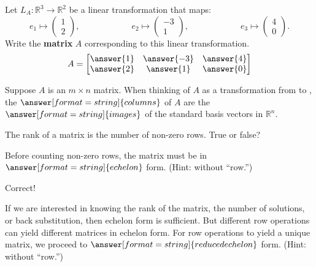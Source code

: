 \documentclass{ximera}
\begin{document}
\begin{question}
  Let $L_A:{\mathbb R}^3\to {\mathbb R}^2$ be a linear transformation that maps:
  \[
  e_1\mapsto \begin{pmatrix} 1\\ 2 \end{pmatrix},\hspace{1in} 
  e_2\mapsto \begin{pmatrix} -3\\ 1 \end{pmatrix},\hspace{1in} 
  e_3\mapsto \begin{pmatrix} 4\\ 0 \end{pmatrix}.
        \]
        Write the \textbf{matrix} $A$ corresponding to this linear
        transformation.
  \[
  A=\begin{bmatrix} \answer{1} &  \answer{-3} &  \answer{4} \\ 
       \answer{2} &  \answer{1} &  \answer{0}\end{bmatrix}
  \]
        
\end{question}


\begin{question}
Suppose $A$ is an $m\times n$ matrix.  When thinking of $A$ as a transformation from
 to 
, the 
$\answer[format=string]{columns}$ of $A$ are the $\answer[format=string]{images}$ of the 
standard basis vectors in ${\mathbb R}^n$. 
\end{question}

\begin{question}
The rank of a matrix is the number of non-zero rows. True or false?  
\begin{multipleChoice}
\end{multipleChoice}
\begin{question}
Before counting non-zero rows, the matrix must be in $\answer[format=string]{echelon}$ form. (Hint: without ``row.'')
\begin{question}
Correct!  

If we are interested in knowing the rank of the matrix, the number of solutions, or back substitution, then echelon form is sufficient.  But different row operations can yield different matrices in echelon form.  For row operations to yield a unique matrix, we proceed to $\answer[format=string]{reduced echelon}$ form. (Hint: without ``row.'')
\end{question}
\end{question}
\end{question}
\end{document}
